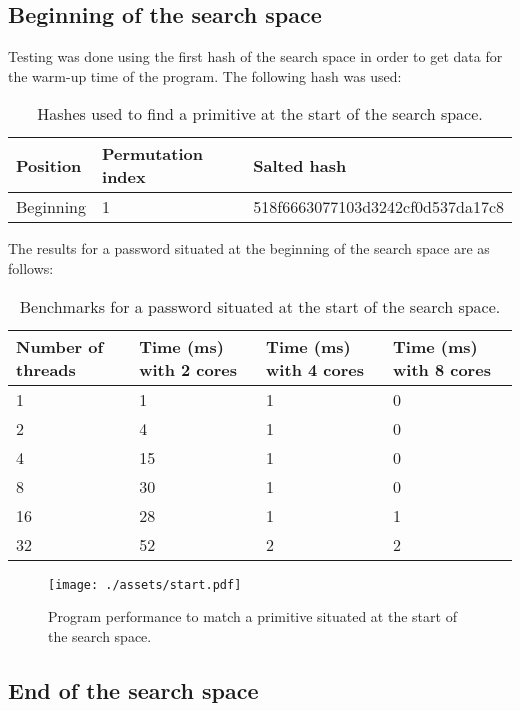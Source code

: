 \documentclass{article}
\begin{document}
\pagebreak
\subsection*{Beginning of the search space}

Testing was done using the first hash of the search space in order to get data for the warm-up time of the program. The
following hash was used:

\begin{table}[!ht]
    \centering
    \begin{tabular}{|l|l|l|}
    \hline
        Position & Permutation index & Salted hash \\ \hline
        Beginning & 1 & 518f6663077103d3242cf0d537da17c8 \\ \hline
    \end{tabular}
    \caption{Hashes used to find a primitive at the start of the search space.}
\end{table}

The results for a password situated at the beginning of the search space are as follows:

\begin{table}[!ht]
    \centering
    \begin{tabular}{|l|l|l|l|}
    \hline
        Number of threads & Time (ms) with 2 cores & Time (ms) with 4 cores & Time (ms) with 8 cores \\ \hline
        1 & 1 & 1 & 0 \\ \hline
        2 & 4 & 1 & 0 \\ \hline
        4 & 15 & 1 & 0 \\ \hline
        8 & 30 & 1 & 0 \\ \hline
        16 & 28 & 1 & 1 \\ \hline
        32 & 52 & 2 & 2 \\ \hline
    \end{tabular}
    \caption{Benchmarks for a password situated at the start of the search space.}
\end{table}

\begin{figure}[!htb]
    \centering
    \texttt{[image: ./assets/start.pdf]}
    \caption{Program performance to match a primitive situated at the start of the search space.}
\end{figure}

\subsection*{End of the search space}
\end{document}
